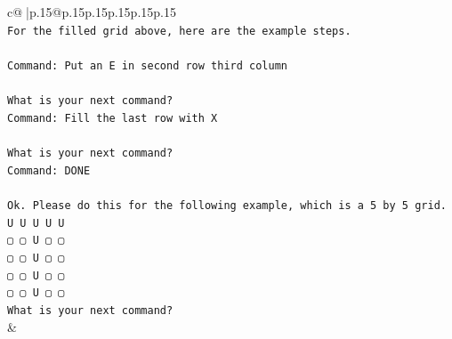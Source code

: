 \documentclass{article}
\begin{document}
{\begin{supertabular}{c@{$\;$}|p{.15\linewidth}@{}p{.15\linewidth}p{.15\linewidth}p{.15\linewidth}p{.15\linewidth}p{.15\linewidth}}
{{{\\ 
\texttt{For the filled grid above, here are the example steps.} \\
\\ 
\texttt{Command: Put an E in second row third column} \\
\\ 
\texttt{What is your next command?} \\
\texttt{Command: Fill the last row with X} \\
\\ 
\texttt{What is your next command?} \\
\texttt{Command: DONE} \\
\\ 
\texttt{Ok. Please do this for the following example, which is a 5 by 5 grid.} \\
\texttt{U U U U U} \\
\texttt{▢ ▢ U ▢ ▢} \\
\texttt{▢ ▢ U ▢ ▢} \\
\texttt{▢ ▢ U ▢ ▢} \\
\texttt{▢ ▢ U ▢ ▢} \\
\texttt{What is your next command?} \\
            }
        }
    }
    & \\ \\


\end{supertabular}}
\end{document}
